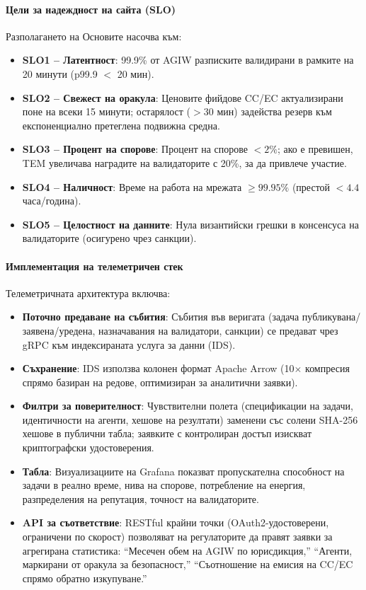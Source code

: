 \documentclass[11pt]{article}
\begin{document}
\paragraph{Цели за надеждност на сайта (SLO)} Разполагането на Основите насочва към:
\begin{itemize}[noitemsep]
  \item \textbf{SLO1 -- Латентност}: 99.9\% от AGIW разписките валидирани в рамките на 20 минути (p99.9 $<$ 20 мин).
  \item \textbf{SLO2 -- Свежест на оракула}: Ценовите фийдове CC/EC актуализирани поне на всеки 15 минути; остарялост ($>30$ мин) задейства резерв към експоненциално претеглена подвижна средна.
  \item \textbf{SLO3 -- Процент на спорове}: Процент на спорове $<2\%$; ако е превишен, TEM увеличава наградите на валидаторите с 20\%, за да привлече участие.
  \item \textbf{SLO4 -- Наличност}: Време на работа на мрежата $\geq 99.95\%$ (престой $<4.4$ часа/година).
  \item \textbf{SLO5 -- Целостност на данните}: Нула византийски грешки в консенсуса на валидаторите (осигурено чрез санкции).
\end{itemize}

\paragraph{Имплементация на телеметричен стек} Телеметричната архитектура включва:
\begin{itemize}[noitemsep]
  \item \textbf{Поточно предаване на събития}: Събития във веригата (задача публикувана/заявена/уредена, назначавания на валидатори, санкции) се предават чрез gRPC към индексираната услуга за данни (IDS).
  \item \textbf{Съхранение}: IDS използва колонен формат Apache Arrow (10$\times$ компресия спрямо базиран на редове, оптимизиран за аналитични заявки).
  \item \textbf{Филтри за поверителност}: Чувствителни полета (спецификации на задачи, идентичности на агенти, хешове на резултати) заменени със солени SHA-256 хешове в публични табла; заявките с контролиран достъп изискват криптографски удостоверения.
  \item \textbf{Табла}: Визуализациите на Grafana показват пропускателна способност на задачи в реално време, нива на спорове, потребление на енергия, разпределения на репутация, точност на валидаторите.
  \item \textbf{API за съответствие}: RESTful крайни точки (OAuth2-удостоверени, ограничени по скорост) позволяват на регулаторите да правят заявки за агрегирана статистика: ``Месечен обем на AGIW по юрисдикция,'' ``Агенти, маркирани от оракула за безопасност,'' ``Съотношение на емисия на CC/EC спрямо обратно изкупуване.''
\end{itemize}
\end{document}
